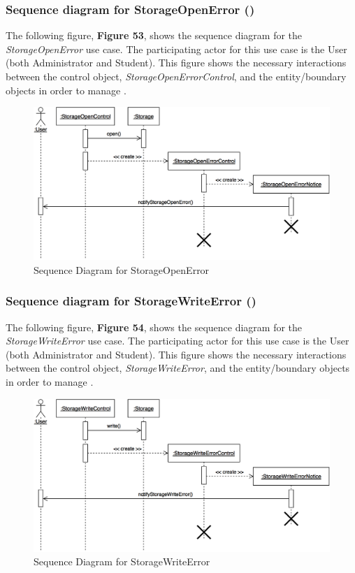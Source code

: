 \documentclass[12pt,letterpaper]{article}
\begin{document}
\subsubsection*{Sequence diagram for StorageOpenError (\storageopenerror{})}

The following figure, {\bf Figure 53}, shows the sequence diagram for the {\it StorageOpenError} use case. The participating actor for this use case is
the User (both Administrator and Student). This figure shows the necessary interactions between the control object, {\it StorageOpenErrorControl}, and the
entity/boundary objects in order to manage \storageopenerror{}.

\begin{figure}[H]
	\centering{}
	\includegraphics[scale=0.3]{imgs/seq/storage-open-error.png}
	\caption{Sequence Diagram for StorageOpenError}
\end{figure}

\subsubsection*{Sequence diagram for StorageWriteError (\storagewriteerror{})}

The following figure, {\bf Figure 54}, shows the sequence diagram for the {\it StorageWriteError} use case. The participating actor for this use case is
the User (both Administrator and Student). This figure shows the necessary interactions between the control object, {\it StorageWriteError}, and the
entity/boundary objects in order to manage \storagewriteerror{}.

\begin{figure}[H]
	\centering{}
	\includegraphics[scale=0.3]{imgs/seq/storage-write-error.png}
	\caption{Sequence Diagram for StorageWriteError}
\end{figure}
\end{document}
